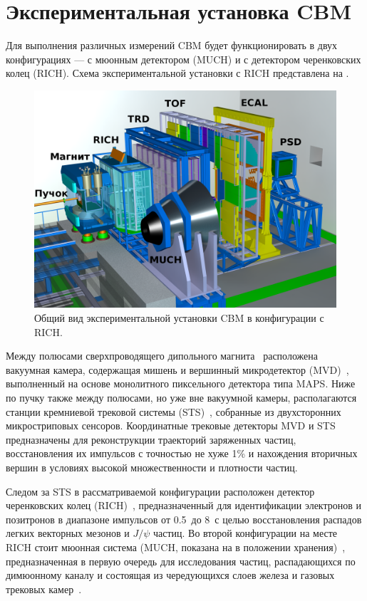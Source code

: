 \section{Экспериментальная установка CBM}\label{sec:secCbmSetup}

Для выполнения различных измерений CBM будет функционировать в двух конфигурациях --- с мюонным детектором (MUCH) и с детектором черенковских колец (RICH). Схема экспериментальной установки с RICH представлена на .

\begin{figure}[H]
\includegraphics[width=1.0\textwidth]{pictures/1_CBM_SIS100_with_names.png}
\caption{Общий вид экспериментальной установки CBM в конфигурации с RICH.}
\label{fig:CBM}
\end{figure}

Между полюсами сверхпроводящего дипольного магнита~\cite{TDR_Magnet} расположена вакуумная камера, содержащая мишень и вершинный микродетектор (MVD)~\cite{MVD_KOZIEL}, выполненный на основе монолитного пиксельного детектора типа MAPS. Ниже по пучку также между полюсами, но уже вне вакуумной камеры, располагаются станции кремниевой трековой системы (STS)~\cite{TDR_STS}, собранные из двухсторонних микростриповых сенсоров. Координатные трековые детекторы MVD и STS предназначены для реконструкции траекторий заряженных частиц, восстановления их импульсов с точностью не хуже 1\% и нахождения вторичных вершин в условиях высокой множественности и плотности частиц.

Следом за STS в рассматриваемой конфигурации расположен детектор черенковских колец (RICH)~\cite{TDR_RICH}, предназначенный для идентификации электронов и позитронов в диапазоне импульсов от 0.5~\GeVoverC до 8~\GeVoverC с целью восстановления распадов легких векторных мезонов и $ J / \psi $ частиц. Во второй конфигурации на месте RICH стоит мюонная система (MUCH, показана на  в положении хранения)~\cite{TDR_MUCH}, предназначенная в первую очередь для исследования частиц, распадающихся по димюонному каналу и состоящая из чередующихся слоев железа и газовых трековых камер~\cite{GEM}.

